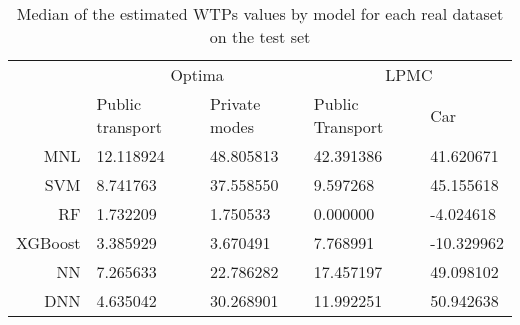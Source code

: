 \begin{table}
\centering
\caption{Median of the estimated WTPs values by model for each real dataset on the test set}
\label{tab:experiment_4_WTP_table}
\begin{tabular}{rllll}
\toprule
{} & \multicolumn{2}{c}{Optima} & \multicolumn{2}{c}{LPMC} \\
\cmidrule(lr){4-5} \cmidrule(lr){2-3} 
{} & Public transport & Private modes & Public Transport &        Car \\
\midrule
MNL     &        12.118924 &     48.805813 &        42.391386 &  41.620671 \\
SVM     &         8.741763 &     37.558550 &         9.597268 &  45.155618 \\
RF      &         1.732209 &      1.750533 &         0.000000 &  -4.024618 \\
XGBoost &         3.385929 &      3.670491 &         7.768991 & -10.329962 \\
NN      &         7.265633 &     22.786282 &        17.457197 &  49.098102 \\
DNN     &         4.635042 &     30.268901 &        11.992251 &  50.942638 \\
\bottomrule
\end{tabular}
\end{table}